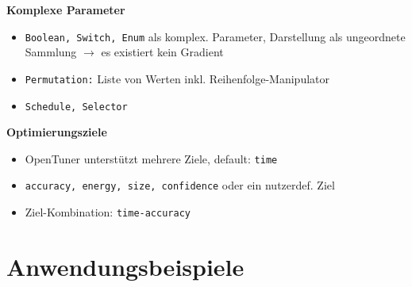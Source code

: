   \begingroup
  \begin{frame}
    \textbf{Komplexe Parameter}
    \begin{itemize}

      \item \texttt{Boolean, Switch, Enum} als komplex. Parameter, Darstellung
      als ungeordnete Sammlung $\rightarrow$ es existiert kein Gradient
      
      \item \texttt{Permutation:} Liste von Werten inkl. Reihenfolge-Manipulator
      \item \texttt{Schedule, Selector} \newline
      
    \end{itemize}
  
  \textbf{Optimierungsziele}
    \begin{itemize}
      \item OpenTuner unterstützt mehrere Ziele, default: \texttt{time}
      \item \texttt{accuracy, energy, size, confidence} oder ein nutzerdef. Ziel
      \item Ziel-Kombination: \texttt{time-accuracy}
    \end{itemize}
  \end{frame}
  \endgroup
    
    \section{Anwendungsbeispiele}
    
    \begin{frame}
      \tableofcontents[currentsection]
    \end{frame}
    
    
